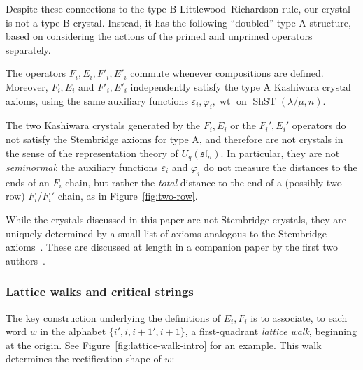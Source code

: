 \documentclass[ALCO,ThmDefs,Unicode,epreuves]{cedram}
\DeclareMathOperator{\ShST}{ShST}
\DeclareMathOperator{\wt}{wt}
\begin{document}
Despite these connections to the type B Littlewood--Richardson rule, our crystal is not a type B crystal. Instead, it has the following ``doubled'' type A structure, based on considering the actions of the primed and unprimed operators separately.

\begin{theorem}\label{thm:main-doubled-typeA}
The operators $F_i,E_i,F'_i,E'_i$ commute whenever compositions are defined. Moreover, $F_i,E_i$ and $F'_i,E'_i$ independently satisfy the type A Kashiwara crystal axioms, using the same auxiliary functions $\varepsilon_i,\varphi_i,\wt$ on $\ShST(\lambda/\mu,n)$.
\end{theorem}

\begin{rema}
The two Kashiwara crystals generated by the $F_i,E_i$ or the $F_i',E_i'$ operators do not satisfy the Stembridge axioms for type A, and therefore are not crystals in the sense of the representation theory of $U_q(\mathfrak{sl}_n)$. In particular, they are not \emph{seminormal}: the auxiliary functions $\varepsilon_i$ and $\varphi_i$ do not measure the distances to the ends of an $F_i$-chain, but rather the \emph{total} distance to the end of a \textup{(}possibly two-row\textup{)} $F_i$/$F_i'$ chain, as in Figure~\ref{fig:two-row}.
\end{rema}

While the crystals discussed in this paper are not Stembridge crystals, they are uniquely determined by a small list of axioms analogous to the Stembridge axioms~\cite{Stembridge-typeA}. These are discussed at length in a companion paper by the first two authors~\cite{GL-axioms}. 

\subsubsection{Lattice walks and critical strings}

The key construction underlying the definitions of $E_i, F_i$ is to associate, to each word $w$ in the alphabet $\{i',i,i{+}1',i{+}1\}$, a first-quadrant \emph{lattice walk}, beginning at the origin. See Figure~\ref{fig:lattice-walk-intro} for an example. 
This walk determines the rectification shape of $w$:
\end{document}
